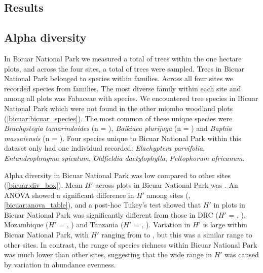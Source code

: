 \begin{refsection}
\section{Results}
\label{bicuar:sec:results}

\subsection{Alpha diversity}
\label{bicuar:ssec:alpha}

In Bicuar National Park we measured a total of \nbicuartrees{} trees within the one hectare plots, and across the four sites,  a total of \ntrees{} trees were sampled. Trees in Bicuar National Park belonged to \nbicuarspecies{} species within \nbicuarfamilies{} families. Across all four sites we recorded \nspecies{} species from \nfamilies{} families. The most diverse family within each site and among all plots was Fabaceae with \nfabaceaespecies{} species. We encountered \nbicuaruniquespecies{} tree species in Bicuar National Park which were not found in the other miombo woodland plots (\autoref{bicuar:bicuar_species}). The most common of these unique species were \textit{Brachystegia tamarindoides} (n = \nbg{}), \textit{Baikiaea plurijuga} (n = \nbp{}) and \textit{Baphia massaiensis} (n = \nbm{}). Four species unique to Bicuar National Park within this dataset only had one individual recorded: \textit{Elachyptera parvifolia}, \textit{Entandrophragma spicatum}, \textit{Oldfieldia dactylophylla}, \textit{Peltophorum africanum}.



Alpha diversity in Bicuar National Park was low compared to other sites (\autoref{bicuar:div_box}). Mean $H'$ across plots in Bicuar National Park was \bicuarshannon{}. An ANOVA showed a significant difference in $H'$ among sites (\lmshannon{}, \autoref{bicuar:anova_table}), and a post-hoc Tukey's test showed that $H'$ in plots in Bicuar National Park was significantly different from those in DRC ($H'$ = \drcshannon{}, \tukeyshannonbicuardrc{}), Mozambique ($H'$ = \nhamshannon{}, \tukeyshannonbicuarnham{}) and Tanzania ($H'$ = \kilwashannon{}, \tukeyshannonbicuarkilwa{}). Variation in $H'$ is large within Bicuar National Park, with $H'$ ranging from \bicuarminshannon{} to \bicuarmaxshannon{}, but this was a similar range to other sites. In contrast, the range of species richness within Bicuar National Park was much lower than other sites, suggesting that the wide range in $H'$ was caused by variation in abundance evenness.


\end{refsection}
